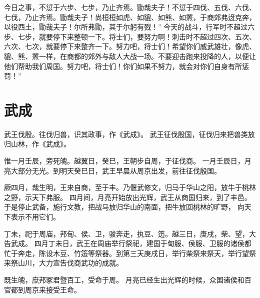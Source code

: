 \documentclass[a4paper,12pt,UTF8,twoside]{ctexbook}
\begin{document}
今日之事，不愆于六步、七步，乃止齐焉。勖哉夫子！不愆于四伐、五伐、六伐、七伐，乃止齐焉。勖哉夫子！尚桓桓如虎、如貔、如熊、如罴，于商郊弗迓克奔，以役西土，勖哉夫子！尔所弗勖，其于尔躬有戮！”
今天的战斗，行军时不超过六步、七步，就要停下来整顿一下。将士们，要努力啊！刺击时不超过四次、五次、六次、七次，就要停下来整齐一下。努力吧，将士们！希望你们威武雄壮，像虎、貔、熊、罴一样，在商都的郊外与敌人大战一场。不要迎击跑来投降的人，以便让他们帮助我们周国。努力吧，将士们！你们如果不努力，就会对你们自身有所惩罚！”

\chapter{武成}

武王伐殷。往伐归兽，识其政事，作《武成》。
武王征伐殷国，征伐归来把兽类放归山林，作《武成》。

惟一月壬辰，旁死魄。越翼日，癸巳，王朝步自周，于征伐商。
一月壬辰日，月亮大部分无光。到明天癸巳日，武王早晨从周京出发，前往征伐殷国。

厥四月，哉生明，王来自商，至于丰。乃偃武修文，归马于华山之阳，放牛于桃林之野，示天下弗服。
四月间，月亮开始放出光辉，武王从商国归来，到了丰邑。于是停止武备，施行文教，把战马放归华山的南面，把牛放回桃林的旷野， 向天下表示不用它们。

丁未，祀于周庙，邦甸、侯、卫，骏奔走，执豆、笾。越三日，庚戌，柴、望，大告武成。
四月丁未日，武王在周庙举行祭祀，建国于甸服、侯服、卫服的诸侯都忙于奔走，陈设木豆、竹笾等祭器。到第三天庚戌日，举行柴祭来祭天，举行望祭来祭山川，大力宣告伐商武功的成就。

既生魄，庶邦冢君暨百工，受命于周。
月亮已经生出光辉的时候，众国诸侯和百官都到周京来接受王命。
\end{document}
